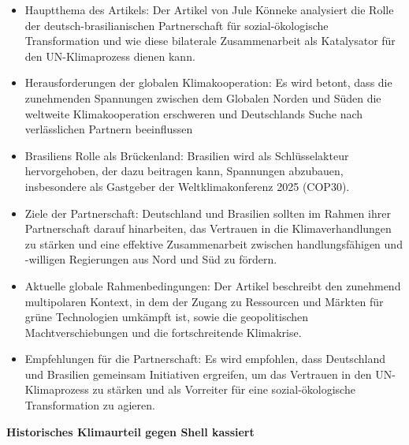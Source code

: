 \documentclass[a4paper, 12pt]{article} %
\begin{document}
\begin{itemize}
   \item Hauptthema des Artikels: Der Artikel von Jule Könneke analysiert die Rolle der deutsch-brasilianischen Partnerschaft für sozial-ökologische Transformation und wie diese bilaterale Zusammenarbeit als Katalysator für den UN-Klimaprozess dienen kann.
   \item Herausforderungen der globalen Klimakooperation: Es wird betont, dass die zunehmenden Spannungen zwischen dem Globalen Norden und Süden die weltweite Klimakooperation erschweren und Deutschlands Suche nach verlässlichen Partnern beeinflussen
   \item Brasiliens Rolle als Brückenland: Brasilien wird als Schlüsselakteur hervorgehoben, der dazu beitragen kann, Spannungen abzubauen, insbesondere als Gastgeber der Weltklimakonferenz 2025 (COP30). 
   \item Ziele der Partnerschaft: Deutschland und Brasilien sollten im Rahmen ihrer Partnerschaft darauf hinarbeiten, das Vertrauen in die Klimaverhandlungen zu stärken und eine effektive Zusammenarbeit zwischen handlungsfähigen und -willigen Regierungen aus Nord und Süd zu fördern.
   \item Aktuelle globale Rahmenbedingungen: Der Artikel beschreibt den zunehmend multipolaren Kontext, in dem der Zugang zu Ressourcen und Märkten für grüne Technologien umkämpft ist, sowie die geopolitischen Machtverschiebungen und die fortschreitende Klimakrise.
   \item Empfehlungen für die Partnerschaft: Es wird empfohlen, dass Deutschland und Brasilien gemeinsam Initiativen ergreifen, um das Vertrauen in den UN-Klimaprozess zu stärken und als Vorreiter für eine sozial-ökologische Transformation zu agieren.
\end{itemize}

\textbf{\cite{ltoHistorischesKlimaurteilGegen2024} Historisches Klimaurteil gegen Shell kassiert}
\end{document}

